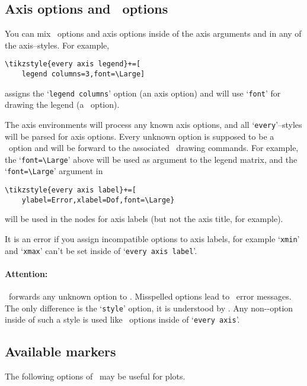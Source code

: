 \subsection{Axis options and \Tikz\ options}
You can mix \Tikz\ options and axis options inside of the axis arguments and in any of the axis--styles. For example,
\begin{lstlisting}
\tikzstyle{every axis legend}+=[
	legend columns=3,font=\Large]
\end{lstlisting}
assigns the `\texttt{legend columns}' option (an axis option) and will use `\texttt{font}' for drawing the legend (a \Tikz\ option).

The axis environments will process any known axis options, and all `\texttt{every}'--styles will be parsed for axis options. Every unknown option is supposed to be a \Tikz\ option and will be forward to the associated \Tikz\ drawing commands. For example, the `\lstinline{font=\Large}' above will be used as argument to the legend matrix, and the `\lstinline{font=\Large}' argument in 
\begin{lstlisting}
\tikzstyle{every axis label}+=[
	ylabel=Error,xlabel=Dof,font=\Large}
\end{lstlisting}
will be used in the nodes for axis labels (but not the axis title, for example).

It is an error if you assign incompatible options to axis labels, for example `\texttt{xmin}' and `\texttt{xmax}' can't be set inside of `\texttt{every axis label}'.

\paragraph{Attention:} \PGFPlots\ forwards any unknown option to \Tikz. Misspelled options lead to \Tikz\ error messages. The only difference is the `\texttt{style}' option, it is understood by \PGFPlots. Any non-\PGFPlots-option inside of such a style is used like \Tikz\ options inside of `\texttt{every axis}'.






\subsection{Available markers}
\label{sec:markers}%
The following options of \Tikz\ may be useful for plots.
